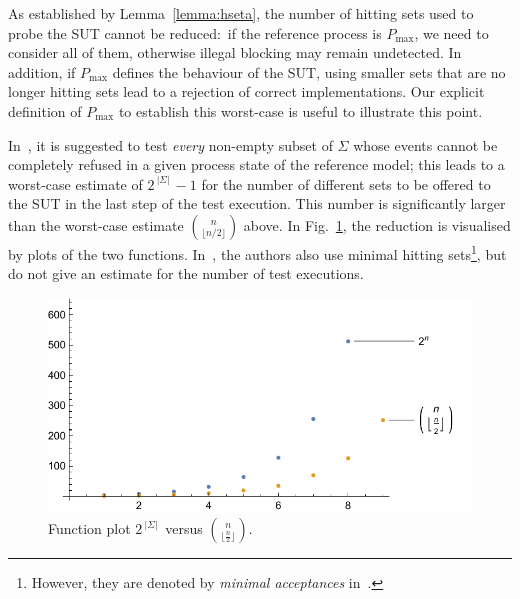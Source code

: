 \documentclass[3p,times]{elsarticle}
\newcommand{\card}[1]{{~|\! #1\!|~}}
\newcommand{\pmax}{P_\text{max}}
\begin{document}
%
As established by Lemma~\ref{lemma:hseta}, the number of hitting sets used to
probe the SUT cannot be reduced:~if the reference process is $\pmax$, we need
to consider all of them, otherwise illegal blocking may remain undetected. In
addition, if $\pmax$ defines the behaviour of the SUT, using smaller sets
that are no longer hitting sets lead to a rejection of correct
implementations. Our explicit definition of $\pmax$ to establish this
worst-case is useful to illustrate this point.

In~\cite{Hennessy:1988:ATP:50497}, it is suggested to test {\it every}
non-empty subset of $\Sigma$ whose events cannot be completely refused in a
given process state of the reference model; this leads to a worst-case
estimate of $2^{\card{\Sigma}}-1$ for the number of different sets to be
offered to the SUT in the last step of the test execution. This number is
significantly larger than the worst-case estimate $\binom{n}{\lfloor
n/2\rfloor}$ above. In Fig.~\ref{fig:minhita}, the reduction is visualised by
plots of the two functions. In~\cite{DBLP:conf/icfem/CavalcantiG07}, the
authors also use minimal hitting sets\footnote{However, they are denoted by
{\it minimal acceptances} in~\cite{DBLP:conf/icfem/CavalcantiG07}.}, but do
not give an estimate for the number of test executions.

 \begin{figure}
 \begin{center}
\includegraphics[scale=.7%
                        ]{curvecomparison.pdf}
\end{center}
\caption{Function plot $2^{\card{\Sigma}}$ versus $\binom{n}{\lfloor \frac{n}{2}\rfloor}$.}
 \label{fig:minhita}
 \end{figure}
\end{document}
